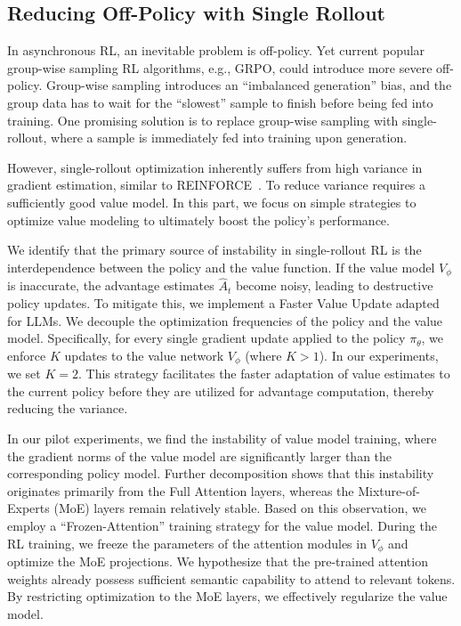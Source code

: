 \subsection{Reducing Off-Policy with Single Rollout}
In asynchronous RL, an inevitable problem is off-policy. Yet current popular group-wise sampling RL algorithms, e.g., GRPO, could introduce more severe off-policy.
Group-wise sampling introduces an ``imbalanced generation'' bias, and the group data has to wait for the ``slowest'' sample to finish before being fed into training.
One promising solution is to replace group-wise sampling with single-rollout, where a sample is immediately fed into training upon generation.

However, single-rollout optimization inherently suffers from high variance in gradient estimation, similar to REINFORCE~\cite{zhang2021sample}. To reduce variance requires a sufficiently good value model. In this part, we focus on simple strategies to optimize value modeling to ultimately boost the policy's performance.  

We identify that the primary source of instability in single-rollout RL is the interdependence between the policy and the value function. If the value model $V_\phi$ is inaccurate, the advantage estimates $\hat{A}_t$ become noisy, leading to destructive policy updates.
To mitigate this, we implement a Faster Value Update adapted for LLMs. We decouple the optimization frequencies of the policy and the value model. Specifically, for every single gradient update applied to the policy $\pi_{\theta}$, we enforce $K$ updates to the value network $V_{\phi}$ (where $K > 1$).
In our experiments, we set $K=2$. This strategy facilitates the faster adaptation of value estimates to the current policy before they are utilized for advantage computation, thereby reducing the variance.

In our pilot experiments, we find the instability of value model training, where the gradient norms of the value model are significantly larger than the corresponding policy model. Further decomposition shows that this instability originates primarily from the Full Attention layers, whereas the Mixture-of-Experts (MoE) layers remain relatively stable.
Based on this observation, we employ a ``Frozen-Attention'' training strategy for the value model. During the RL training, we freeze the parameters of the attention modules in $V_\phi$ and optimize the MoE projections.
We hypothesize that the pre-trained attention weights already possess sufficient semantic capability to attend to relevant tokens. By restricting optimization to the MoE layers, we effectively regularize the value model.

